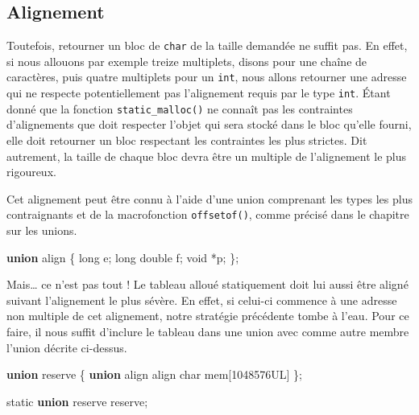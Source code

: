 \documentclass[]{article}
\newenvironment{Shaded}{}{}
\newcommand{\KeywordTok}[1]{\textcolor[rgb]{0.00,0.44,0.13}{\textbf{{#1}}}}
\newcommand{\DataTypeTok}[1]{\textcolor[rgb]{0.56,0.13,0.00}{{#1}}}
\newcommand{\NormalTok}[1]{{#1}}
\begin{document}
\subsection{Alignement}\label{alignement}

Toutefois, retourner un bloc de \texttt{char} de la taille demandée ne
suffit pas. En effet, si nous allouons par exemple treize multiplets,
disons pour une chaîne de caractères, puis quatre multiplets pour un
\texttt{int}, nous allons retourner une adresse qui ne respecte
potentiellement pas l'alignement requis par le type \texttt{int}. Étant
donné que la fonction \texttt{static\_malloc()} ne connaît pas les
contraintes d'alignements que doit respecter l'objet qui sera stocké
dans le bloc qu'elle fourni, elle doit retourner un bloc respectant les
contraintes les plus strictes. Dit autrement, la taille de chaque bloc
devra être un multiple de l'alignement le plus rigoureux.

Cet alignement peut être connu à l'aide d'une union comprenant les types
les plus contraignants et de la macrofonction \texttt{offsetof()}, comme
précisé dans le chapitre sur les unions.

\begin{Shaded}
\begin{Highlighting}[]
\KeywordTok{union} \NormalTok{align}
\NormalTok{\{}
    \DataTypeTok{long} \NormalTok{e;}
    \DataTypeTok{long} \DataTypeTok{double} \NormalTok{f;}
    \DataTypeTok{void} \NormalTok{*p;}
\NormalTok{\};}
\end{Highlighting}
\end{Shaded}

Mais\ldots{} ce n'est pas tout ! Le tableau alloué statiquement doit lui
aussi être aligné suivant l'alignement le plus sévère. En effet, si
celui-ci commence à une adresse non multiple de cet alignement, notre
stratégie précédente tombe à l'eau. Pour ce faire, il nous suffit
d'inclure le tableau dans une union avec comme autre membre l'union
décrite ci-dessus.

\begin{Shaded}
\begin{Highlighting}[]
\KeywordTok{union} \NormalTok{reserve}
\NormalTok{\{}
    \KeywordTok{union} \NormalTok{align align}
    \DataTypeTok{char} \NormalTok{mem[1048576UL]}
\NormalTok{\};}

\DataTypeTok{static} \KeywordTok{union} \NormalTok{reserve reserve;}
\end{Highlighting}
\end{Shaded}
\end{document}
